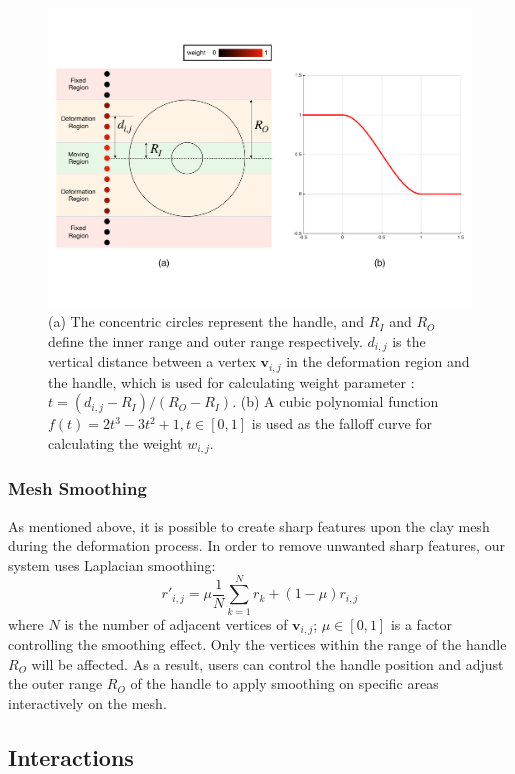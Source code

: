 \documentclass{svjour3}                     %
\begin{document}
\begin{figure}
\includegraphics[width=\textwidth]{fig8.pdf}
\caption{(a) The concentric circles represent the handle, and $R_{I}$ and $R_{O}$ define the inner range and outer range respectively. $d_{i,j}$ is the vertical distance between a vertex $\mathbf{v}_{i,j}$ in the deformation region and the handle, which is used for calculating weight parameter : $t = (d_{i,j} - R_{I}) / (R_{O} - R_{I})$. (b) A cubic polynomial function $f(t) = 2t^3 - 3t^2 + 1, t \in [0,1]$ is used as the falloff curve for calculating the weight $w_{i,j}$. }
\label{fig:deform}
\end{figure}

\subsubsection{Mesh Smoothing}
\label{sec:4.2.4}
As mentioned above, it is possible to create sharp features upon the clay mesh during the deformation process. In order to remove unwanted sharp features, our system uses Laplacian smoothing:
\begin{equation}
r'_{i,j} = 
\mu  \frac{1}{N} 
\sum_{k=1}^N r_{k}
+ (1 - \mu)  r_{i,j}
\end{equation}
where $N$ is the number of adjacent vertices of $\mathbf{v}_{i,j}$; $\mu \in [0,1]$ is a factor controlling the smoothing effect.
Only the vertices within the range of the handle $R_{O}$ will be affected.
As a result, users can control the handle position and adjust the outer range $R_{O}$ of the handle to apply smoothing on specific areas interactively on the mesh.

\subsection{Interactions}
\label{sec:4.3}
\end{document}
